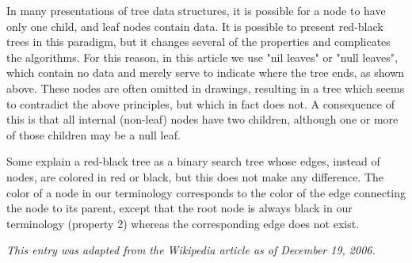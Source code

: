 \documentclass[12pt]{article}
\begin{document}
In many presentations of tree data structures, it is possible for a node to have only one child, and leaf nodes contain data. It is possible to present red-black trees in this paradigm, but it changes several of the properties and complicates the algorithms. For this reason, in this article we use "nil leaves" or "null leaves", which contain no data and merely serve to indicate where the tree ends, as shown above. These nodes are often omitted in drawings, resulting in a tree which seems to contradict the above principles, but which in fact does not. A consequence of this is that all internal (non-leaf) nodes have two children, although one or more of those children may be a null leaf.

Some explain a red-black tree as a binary search tree whose edges, instead of nodes, are colored in red or black, but this does not make any difference. The color of a node in our terminology corresponds to the color of the edge connecting the node to its parent, except that the root node is always black in our terminology (property 2) whereas the corresponding edge does not exist.

{\it This entry was adapted from the Wikipedia article  as of December 19, 2006.}
\end{document}
